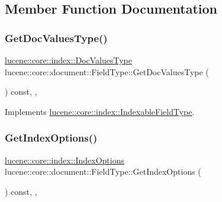 \subsection{Member Function Documentation}
\mbox{\label{classlucene_1_1core_1_1document_1_1FieldType_ac5b53a2d9ebbb926199f9e2f58dc0537}} 
\subsubsection{\texorpdfstring{Get\+Doc\+Values\+Type()}{GetDocValuesType()}}
{\footnotesize\ttfamily \mbox{\hyperlink{namespacelucene_1_1core_1_1index_a2f7ffaef6429b5df542c8aa12f8b9883}{lucene\+::core\+::index\+::\+Doc\+Values\+Type}} lucene\+::core\+::document\+::\+Field\+Type\+::\+Get\+Doc\+Values\+Type (\begin{DoxyParamCaption}{ }\end{DoxyParamCaption}) const\hspace{0.3cm}{\ttfamily [inline]}, {\ttfamily [virtual]}, {\ttfamily [noexcept]}}



Implements \mbox{\hyperlink{classlucene_1_1core_1_1index_1_1IndexableFieldType_a3caeba48e5779f266829e82b9d45e996}{lucene\+::core\+::index\+::\+Indexable\+Field\+Type}}.

\mbox{\label{classlucene_1_1core_1_1document_1_1FieldType_ae51c6c54d9992fbe3102715ff94778ec}} 
\subsubsection{\texorpdfstring{Get\+Index\+Options()}{GetIndexOptions()}}
{\footnotesize\ttfamily \mbox{\hyperlink{namespacelucene_1_1core_1_1index_a0d5e1f98471a76de106056cf3b5a7897}{lucene\+::core\+::index\+::\+Index\+Options}} lucene\+::core\+::document\+::\+Field\+Type\+::\+Get\+Index\+Options (\begin{DoxyParamCaption}{ }\end{DoxyParamCaption}) const\hspace{0.3cm}{\ttfamily [inline]}, {\ttfamily [virtual]}, {\ttfamily [noexcept]}}




